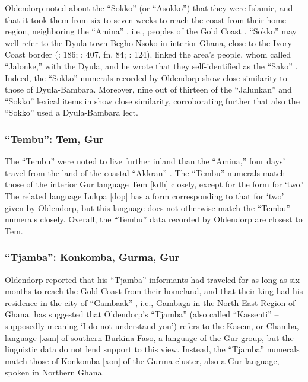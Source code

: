 \documentclass[output=paper,colorlinks,citecolor=brown]{langscibook}
\begin{document}
Oldendorp noted about the ``Sokko'' (or ``Asokko'') that they were Islamic, and that it took them from six to seven weeks to reach the coast from their home region, neighboring the ``Amina'' \citep[407--408]{Oldendorp_2000}, i.e., peoples of the Gold Coast \citep[cf.][247--248]{Law2005}. ``Sokko'' may well refer to the Dyula town Begho-Nsoko in interior Ghana, close to the Ivory Coast border (\cite{Jones_2010}: 186; \cite{Oldendorp_2000}: 407, fn. 84; \cite{Stahl_2001}: 124). \citet{Migeod_1913} linked the area’s people, whom \citet{Koelle_1854} called ``Jalonke,'' with the Dyula, and he wrote that they self-identified as the ``Sako'' \citep[346]{Migeod_1913}. Indeed, the ``Sokko'' numerals recorded by Oldendorp show close similarity to those of Dyula-Bambara. Moreover, nine out of thirteen of the ``Jalunkan'' and ``Sokko'' lexical items in \citet[460--461]{Oldendorp_2000} show close similarity, corroborating further that also the ``Sokko'' used a Dyula-Bambara lect.

\subsubsection{``Tembu'': Tem, Gur}

The ``Tembu'' were noted to live further inland than the ``Amina,'' four days' travel from the land of the coastal ``Akkran'' \citep[399--400] {Oldendorp_2000}. The ``Tembu'' numerals match those of the interior Gur language Tem [kdh] closely, except for the form for `two.' The related language Lukpa [dop] has a form corresponding to that for `two' given by Oldendorp, but this language does not otherwise match the “Tembu” numerals closely. Overall, the ``Tembu'' data recorded by Oldendorp are closest to Tem.

\subsubsection{``Tjamba'': Konkomba, Gurma, Gur}

Oldendorp reported that his ``Tjamba'' informants had traveled for as long as six months to reach the Gold Coast from their homeland, and that their king had his residence in the city of ``Gambaak'' \citep[403--404]{Oldendorp_2000}, i.e., Gambaga in the North East Region of Ghana. \citet[186]{Jones_2010} has suggested that Oldendorp’s ``Tjamba'' (also called ``Kassenti'' – supposedly meaning `I do not understand you') refers to the Kasem, or Chamba, language [xsm] of southern Burkina Faso, a language of the Gur group, but the linguistic data do not lend support to this view. Instead, the ``Tjamba'' numerals match those of Konkomba [xon] of the Gurma cluster, also a Gur language, spoken in Northern Ghana.
\end{document}
